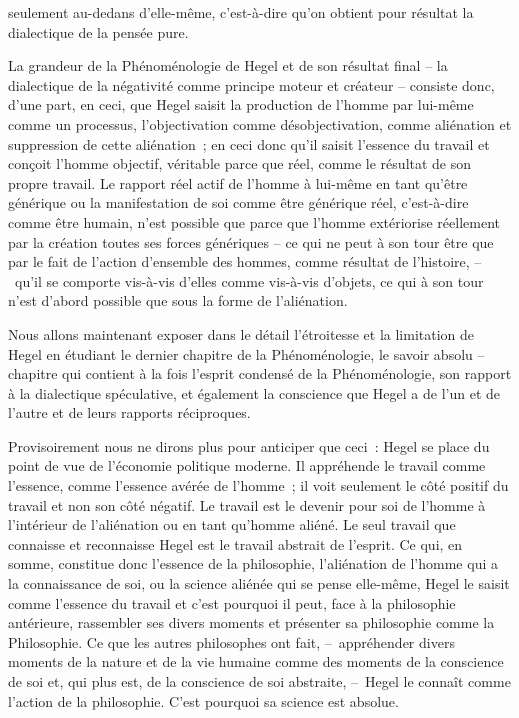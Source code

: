 \documentclass[french,twoside]{book} %
\begin{document}
seulement au-dedans d’elle-même, c’est-à-dire qu’on obtient pour résultat la dialectique de la pensée pure.\par
[XXIII] La grandeur de la Phénoménologie de Hegel et de son résultat final – la dialectique de la négativité comme principe moteur et créateur – consiste donc, d’une part, en ceci, que Hegel saisit la production de l’homme par lui-même comme un processus, l’objectivation comme désobjectivation, comme aliénation et suppression de cette aliénation ; en ceci donc qu’il saisit l’essence du travail et conçoit l’homme objectif, véritable parce que réel, comme le résultat de son propre travail. Le rapport réel actif de l’homme à lui-même en tant qu’être générique ou la manifestation de soi comme être générique réel, c’est-à-dire comme être humain, n’est possible que parce que l’homme extériorise réellement par la création toutes ses forces génériques – ce qui ne peut à son tour être que par le fait de l’action d’ensemble des hommes, comme résultat de l’histoire, – qu’il se comporte vis-à-vis d’elles comme vis-à-vis d’objets, ce qui à son tour n’est d’abord possible que sous la forme de l’aliénation.\par
Nous allons maintenant exposer dans le détail l’étroitesse et la limitation de Hegel en étudiant le dernier chapitre de la Phénoménologie, le savoir absolu – chapitre qui contient à la fois l’esprit condensé de la Phénoménologie, son rapport à la dialectique spéculative, et également la conscience que Hegel a de l’un et de l’autre et de leurs rapports réciproques.\par
Provisoirement nous ne dirons plus pour anticiper que ceci : Hegel se place du point de vue de l’économie politique moderne. Il appréhende le travail comme l’essence, comme l’essence avérée de l’homme ; il voit seulement le côté positif du travail et non son côté négatif. Le travail est le devenir pour soi de l’homme à l’intérieur de l’aliénation ou en tant qu’homme aliéné. Le seul travail que connaisse et reconnaisse Hegel est le travail abstrait de l’esprit. Ce qui, en somme, constitue donc l’essence de la philosophie, l’aliénation de l’homme qui a la connaissance de soi, ou la science aliénée qui se pense elle-même, Hegel le saisit comme l’essence du travail et c’est pourquoi il peut, face à la philosophie antérieure, rassembler ses divers moments et présenter sa philosophie comme la Philosophie. Ce que les autres philosophes ont fait, – appréhender divers moments de la nature et de la vie humaine comme des moments de la conscience de soi et, qui plus est, de la conscience de soi abstraite, – Hegel le connaît comme l’action de la philosophie. C’est pourquoi sa science est absolue.\par
\end{document}
